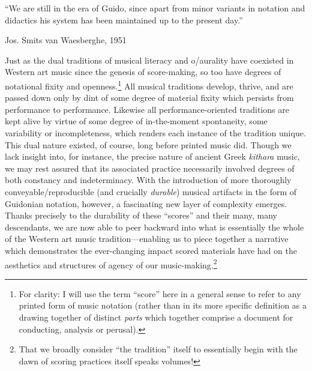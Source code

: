 

\epigraph{\singlespacing ``We are still in the era of Guido, since apart from minor variants in notation and didactics his system has been maintained up to the present day.''}{Jos. Smits van Waesberghe, 1951}

    
    Just as the dual traditions of musical literacy and o/aurality have coexisted in Western art music since the genesis of score-making, so too have degrees of notational fixity and openness.\footnote{For clarity: I will use the term ``score'' here in a general sense to refer to any printed form of music notation (rather than in its more specific definition as a drawing together of distinct \textit{parts} which together comprise a document for conducting, analysis or perusal).} All musical traditions develop, thrive, and are passed down only by dint of some degree of material fixity which persists from performance to performance. Likewise all performance-oriented traditions are kept alive by virtue of some degree of in-the-moment spontaneity, some variability or incompleteness, which renders each instance of the tradition unique. This dual nature existed, of course, long before printed music did. Though we lack insight into, for instance, the precise nature of ancient Greek \textit{kithara} music, we may rest assured that its associated practice necessarily involved degrees of both constancy and indeterminacy. With the introduction of more thoroughly conveyable/reproducible (and crucially \textit{durable}) musical artifacts in the form of Guidonian notation, however, a fascinating new layer of complexity emerges. Thanks precisely to the durability of these ``scores'' and their many, many descendants, we are now able to peer backward into what is essentially the whole of the Western art music tradition---enabling us to piece together a narrative which demonstrates the ever-changing impact scored materials have had on the aesthetics and structures of agency of our music-making.\footnote{That we broadly consider ``the tradition'' itself to essentially begin with the dawn of scoring practices itself speaks volumes!}

